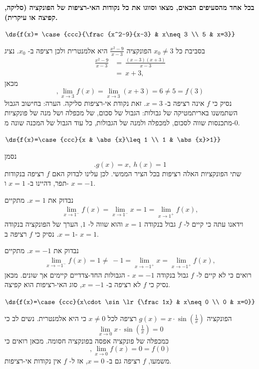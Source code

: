 \textbf{
בכל אחד מהסעיפים הבאים,
מצאו וסווגו את כל נקודות האי-רציפות של הפונקציה (סליקה, קפיצה או עיקרית).
}
\bE
\item $\ds{f(x)=
\case{ccc}{\frac{x^2-9}{x-3} & x\neq 3 \\ 5 & x=3}}$
\begin{solbox}
בסביבת כל
$x_0\neq 3$
הפונקציה
$\frac{x^2-9}{x-3}$
היא אלמנטרית ולכן רציפה ב-
$x_0$.
נציג
\begin{align*}
    \frac{x^2-9}{x-3}&=\ \frac{(x-3)(x+3)}{x-3}\\
    &=\ x+3,
\end{align*}
מכאן
$$,\lim_{x\to3}f(x)=\lim_{x\to3}(x+3)=6\neq5=f(3)$$
נסיק כי
$f$
אינה רציפה ב-
$x=3$.
זאת נקודת אי-רציפות סליקה.
הערה: בחישוב הגבול השתמשנו באריתמטיקה של גבולות: הגבול של סכום, של מכפלה ושל מנה של פונקציות מתכנסות שווה לסכום, למכפלה ולמנה של הגבולות, כל עוד הגבול של המכנה שונה מ-$0$.
\end{solbox}
\item $\ds{f(x)=\case{ccc}{x & \abs{x}\leq1 \\ 1 & \abs{x}>1}}$
\begin{solbox}
נסמן
$$.g(x)=x,\ h(x)=1$$
שתי הפונקציות האלה רציפות בכל הציר הממשי. לכן עלינו לבדוק האם
$f$
רציפה בנקודות תפר, דהיינו ב-
$x=1$
ו-
$x=-1$.

נבדוק את
$x=1$.
מתקיים
\begin{align*}
    \lim_{x\to1^-}f(x)= \lim_{x\to1^-}x
    = 1
    =\lim_{x\to1^+}f(x),
\end{align*}
וידאנו עתה כי קיים ל-
$f$
גבול בנקודה
$x=1$
והוא שווה ל-
$1$,
הערך של הפונקציה בנקודה
$x=1$.
נסיק כי
$f$
רציפה ב-
$x=1$.

נבדוק את
$x=-1$.
מתקיים
\begin{align*}
    \lim_{x\to-1^-}f(x)= 1
    \neq\ -1
    = \lim_{x\to-1^+}x
    =\lim_{x\to-1^+}f(x),
\end{align*}
רואים כי  לא קיים ל-
$f$
גבול בנקודה
$x=-1$ -
הגבולות החד-צדדיים קיימים אך שונים.
מכאן נסיק כי
$f$
לא רציפה ב-
$x=-1$,
סוג האי-רציפות הוא קפיצה.
\end{solbox}
\item $\ds{f(x)=\case{ccc}{x\cdot\sin\lr{\frac1x} & x\neq 0 \\ 0 & x=0}}$
\begin{solbox}
הפונקציה
$g(x)=x\cdot\sin(\tfrac{1}{x})$
רציפה לכל
$x\neq0$
כי היא אלמנטרית.
נשים לב כי
$$\lim_{x\to0}x\cdot\sin(\tfrac{1}{x})=0$$
כמכפלה של פונקציה אפסה בפונקציה חסומה.
מכאן רואים כי
$$,\lim_{x\to0}f(x)=0=f(0)$$
משמעו,
$f$
רציפה גם ב-
$x=0$,
אז ל-
$f$
אין נקודות אי-רציפות.
\end{solbox}
